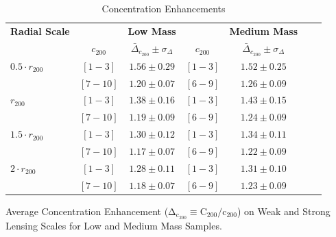 \begin{table}
\begin{center}
\caption{Concentration Enhancements}
\label{table-3}
\begin{tabular}{@{}lcccccc}
\hline
\hline
\textbf{Radial Scale}& & \textbf{Low Mass} & & \textbf{Medium Mass} \\ 
& $c_{200}$ & $\bar{\Delta}_{c_{200}} \pm \sigma_{\Delta}$ & $c_{200}$ & $\bar{\Delta}_{c_{200}} \pm \sigma_{\Delta}$ \\ 
\hline
$0.5 \cdot r_{200}$ & $[1-3]$ & $1.56 \pm 0.29$ & $[1-3]$ & $1.52 \pm 0.25$\\
& $[7-10]$ & $1.20 \pm 0.07$ & $[6-9]$ & $1.26 \pm 0.09$ \\
\hline
$ r_{200}$ & $[1-3]$ & $1.38 \pm 0.16$ & $[1-3]$ & $1.43 \pm 0.15$\\
& $[7-10]$ & $1.19 \pm 0.09$ & $[6-9]$ & $1.24 \pm 0.09$\\
\hline
$1.5 \cdot r_{200}$ & $[1-3]$ & $1.30 \pm 0.12$ & $[1-3]$ & $1.34 \pm 0.11$ \\
& $[7-10]$ & $1.17 \pm 0.07$ & $[6-9]$ & $1.22 \pm 0.09$ \\
\hline
$2 \cdot r_{200}$ & $[1-3]$ & $1.28 \pm 0.11$ & $[1-3]$ & $1.31 \pm 0.10$\\
& $[7-10]$ & $1.18 \pm 0.07$ & $[6-9]$ & $1.23 \pm 0.09 $ \\
\hline

\end{tabular}

\medskip
Average Concentration Enhancement ($\mathrm{\Delta_{c_{200}} \equiv
C_{200}/c_{200}}$) on Weak and Strong Lensing Scales for Low and Medium
Mass Samples.
\end{center}
\end{table}


